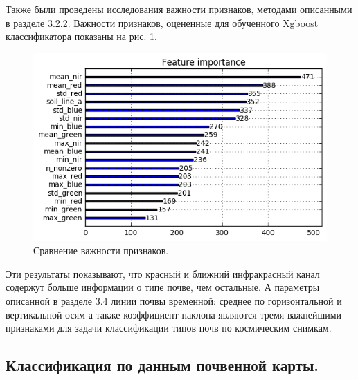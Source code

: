 \documentclass[14pt]{extarticle}
\begin{document}
Также были проведены исследования важности признаков, методами описанными в разделе 3.2.2.
Важности признаков, оцененные для обученного Xgboost классификатора показаны на рис. 
\ref{image:cuts_importance}.
\begin{figure}[H]
\centering
\includegraphics[width=\linewidth]{imgs/cuts_importance.png}
\caption{Сравнение важности признаков.}
\label{image:cuts_importance}
\end{figure}
Эти результаты показывают, что красный и ближний инфракрасный канал содержут больше информации
о типе почве, чем остальные. А параметры описанной в разделе 3.4 линии почвы временной:
среднее по горизонтальной и вертикальной осям а также коэффициент наклона являются тремя
важнейшими признаками для задачи классификации типов почв по космическим снимкам.

\subsection{Классификация по данным почвенной карты.}
\end{document}
